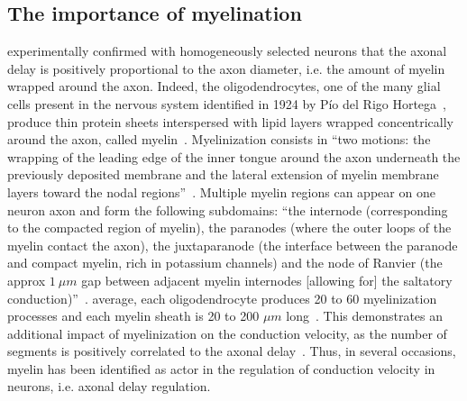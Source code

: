 \documentclass[brainsci, %
               review,submit,pdftex,moreauthors
               ]{Definitions/mdpi}
\begin{document}
\subsection{The importance of myelination}
\citet{gasser_axon_1939} experimentally confirmed with homogeneously selected neurons that the axonal delay is positively proportional to the axon diameter, i.e. the amount of myelin wrapped around the axon. Indeed, the oligodendrocytes, one of the many glial cells present in the  nervous system identified in 1924 by Pío del Rigo Hortega~\citep{perez-cerda_pio_2015}, produce thin protein sheets interspersed with lipid layers wrapped concentrically around the axon, called myelin~\citep{schmitt_ultrastructure_1939}. Myelinization consists in ``two motions: the wrapping of the leading edge of the inner tongue around the axon underneath the previously deposited membrane and the lateral extension of myelin membrane layers toward the nodal regions''~\citep{simons_oligodendrocytes_2016}. Multiple myelin regions can appear on one neuron axon and form the following subdomains: ``the internode (corresponding to the compacted region of myelin), the paranodes (where the outer loops of the myelin contact the axon), the juxtaparanode (the interface between the paranode and compact myelin, rich in potassium channels) and the node of Ranvier (the approx $1~\mu m$ gap between adjacent myelin internodes [allowing for] the saltatory conduction)''~\citep{duncan_neuron-oligodendrocyte_2021}.  average, each oligodendrocyte produces 20 to 60 myelinization processes and each myelin sheath is 20 to 200 $\mu m$ long~\citep{simons_oligodendrocytes_2016}. This demonstrates an additional impact of myelinization on the conduction velocity, as the number of segments is positively correlated to the axonal delay~\citep{brill_conduction_1977}. Thus, in several occasions, myelin has been identified as  actor in the regulation of conduction velocity in neurons, i.e. axonal delay regulation.

\end{document}

